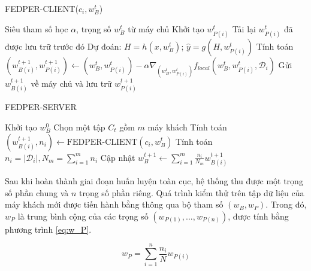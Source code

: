\begin{algorithm}[H]
    \caption{FEDPER-CLIENT($c_i, w_B^t$) \cite{arivazhagan2019federated}} \label{alg:fedper_client}
    \begin{algorithmic}[1]
        \Require Siêu tham số học $\alpha$, trọng số $w_B^t$ từ máy chủ
            \State Khởi tạo $w_{P(i)}^t$
        \Else
            \State Tải lại $w_{P(i)}^t$ đã được lưu trữ trước đó
        \EndIf
        \State Dự đoán: $H = h(x, w_{B}^t)$; $\hat{y} = g(H, w_{P(i)}^t)$
        \State Tính toán $(w_{B(i)}^{t+1}, w_{P(i)}^{t+1}) \gets (w_{B}^t, w_{P(i)}^t) - \alpha\nabla_{(w_{B}^t, w_{P(i)}^t)} f_{local}(w_{B}^t, w_{P(i)}^t, \mathcal{D}_i)$
        \State Gửi $w_{B(i)}^{t+1}$ về máy chủ và lưu trữ $w_{P(i)}^{t+1}$
    \end{algorithmic}
\end{algorithm}

\begin{algorithm}[H]
    \caption{FEDPER-SERVER \cite{arivazhagan2019federated}} \label{alg:fedper_server}
    \begin{algorithmic}[1]
        \State Khởi tạo $w_{B}^{0}$
            \State Chọn một tập $C_t$ gồm $m$ máy khách
                \State Tính toán $(w_{B(i)}^{t+1}, n_i) \gets \text{FEDPER-CLIENT}(c_i, w_B^t)$
            \EndFor
            \State Tính toán $n_i = \left| \mathcal{D}_i \right|, N_m = \sum_{i=1}^m n_i$
            \State Cập nhật $w_B^{t+1} \gets \sum_{i=1}^m \frac{n_i}{N_m} w_{B(i)}^{t+1}$
        \EndFor
    \end{algorithmic}
\end{algorithm}

Sau khi hoàn thành giai đoạn huấn luyện toàn cục, hệ thống thu được một trọng số phần chung và $n$ trọng số phần riêng. Quá trình kiểm thử trên tập dữ liệu của máy khách mới được tiến hành bằng thông qua bộ tham số $(w_B, w_P)$. Trong đó, $w_P$ là trung bình cộng của các trọng số $(w_{P(1)},...,w_{P(n)})$, được tính bằng phương trình \ref{eq:w_P}.

\begin{dmath}
    \label{eq:w_P}
    w_P = \sum_{i=1}^n \frac{n_i}{N}w_{P(i)}
\end{dmath}


